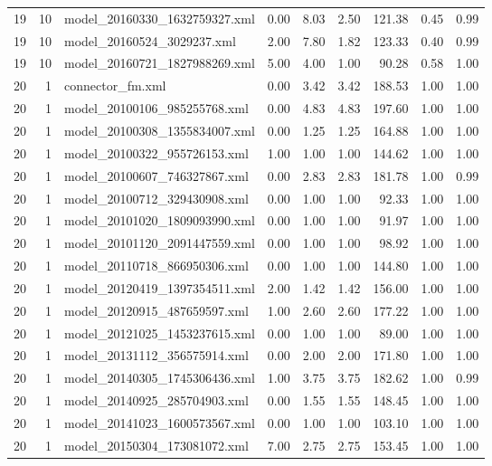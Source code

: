 \begin{table}[ht]
\begin{tabular}{rrlrrrrrr}
   19 &  10 & model\_20160330\_1632759327.xml & 0.00 & 8.03 & 2.50 & 121.38 & 0.45 & 0.99 \\ 
   19 &  10 & model\_20160524\_3029237.xml & 2.00 & 7.80 & 1.82 & 123.33 & 0.40 & 0.99 \\ 
   19 &  10 & model\_20160721\_1827988269.xml & 5.00 & 4.00 & 1.00 & 90.28 & 0.58 & 1.00 \\ 
   20 &   1 & connector\_fm.xml & 0.00 & 3.42 & 3.42 & 188.53 & 1.00 & 1.00 \\ 
   20 &   1 & model\_20100106\_985255768.xml & 0.00 & 4.83 & 4.83 & 197.60 & 1.00 & 1.00 \\ 
   20 &   1 & model\_20100308\_1355834007.xml & 0.00 & 1.25 & 1.25 & 164.88 & 1.00 & 1.00 \\ 
   20 &   1 & model\_20100322\_955726153.xml & 1.00 & 1.00 & 1.00 & 144.62 & 1.00 & 1.00 \\ 
   20 &   1 & model\_20100607\_746327867.xml & 0.00 & 2.83 & 2.83 & 181.78 & 1.00 & 0.99 \\ 
   20 &   1 & model\_20100712\_329430908.xml & 0.00 & 1.00 & 1.00 & 92.33 & 1.00 & 1.00 \\ 
   20 &   1 & model\_20101020\_1809093990.xml & 0.00 & 1.00 & 1.00 & 91.97 & 1.00 & 1.00 \\ 
   20 &   1 & model\_20101120\_2091447559.xml & 0.00 & 1.00 & 1.00 & 98.92 & 1.00 & 1.00 \\ 
   20 &   1 & model\_20110718\_866950306.xml & 0.00 & 1.00 & 1.00 & 144.80 & 1.00 & 1.00 \\ 
   20 &   1 & model\_20120419\_1397354511.xml & 2.00 & 1.42 & 1.42 & 156.00 & 1.00 & 1.00 \\ 
   20 &   1 & model\_20120915\_487659597.xml & 1.00 & 2.60 & 2.60 & 177.22 & 1.00 & 1.00 \\ 
   20 &   1 & model\_20121025\_1453237615.xml & 0.00 & 1.00 & 1.00 & 89.00 & 1.00 & 1.00 \\ 
   20 &   1 & model\_20131112\_356575914.xml & 0.00 & 2.00 & 2.00 & 171.80 & 1.00 & 1.00 \\ 
   20 &   1 & model\_20140305\_1745306436.xml & 1.00 & 3.75 & 3.75 & 182.62 & 1.00 & 0.99 \\ 
   20 &   1 & model\_20140925\_285704903.xml & 0.00 & 1.55 & 1.55 & 148.45 & 1.00 & 1.00 \\ 
   20 &   1 & model\_20141023\_1600573567.xml & 0.00 & 1.00 & 1.00 & 103.10 & 1.00 & 1.00 \\ 
   20 &   1 & model\_20150304\_173081072.xml & 7.00 & 2.75 & 2.75 & 153.45 & 1.00 & 1.00 \\ 

\end{tabular}
\end{table}
